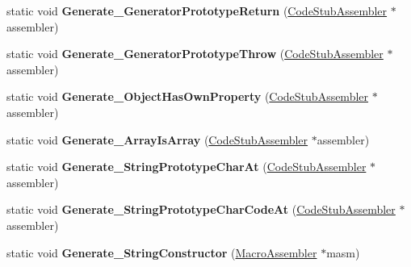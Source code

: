 \begin{DoxyCompactItemize}
\item 
static void {\bfseries Generate\+\_\+\+Generator\+Prototype\+Return} (\hyperlink{classv8_1_1internal_1_1_code_stub_assembler}{Code\+Stub\+Assembler} $\ast$assembler)\hypertarget{classv8_1_1internal_1_1_builtins_a6ef3810594f5eb2e21593a832d513325}{}\label{classv8_1_1internal_1_1_builtins_a6ef3810594f5eb2e21593a832d513325}

\item 
static void {\bfseries Generate\+\_\+\+Generator\+Prototype\+Throw} (\hyperlink{classv8_1_1internal_1_1_code_stub_assembler}{Code\+Stub\+Assembler} $\ast$assembler)\hypertarget{classv8_1_1internal_1_1_builtins_ac3220fe2c4417db9bfa2c847f2399386}{}\label{classv8_1_1internal_1_1_builtins_ac3220fe2c4417db9bfa2c847f2399386}

\item 
static void {\bfseries Generate\+\_\+\+Object\+Has\+Own\+Property} (\hyperlink{classv8_1_1internal_1_1_code_stub_assembler}{Code\+Stub\+Assembler} $\ast$assembler)\hypertarget{classv8_1_1internal_1_1_builtins_a40805d22b777f387e73c6fb1110695af}{}\label{classv8_1_1internal_1_1_builtins_a40805d22b777f387e73c6fb1110695af}

\item 
static void {\bfseries Generate\+\_\+\+Array\+Is\+Array} (\hyperlink{classv8_1_1internal_1_1_code_stub_assembler}{Code\+Stub\+Assembler} $\ast$assembler)\hypertarget{classv8_1_1internal_1_1_builtins_a556a327920caab642e0b76997a2bfa83}{}\label{classv8_1_1internal_1_1_builtins_a556a327920caab642e0b76997a2bfa83}

\item 
static void {\bfseries Generate\+\_\+\+String\+Prototype\+Char\+At} (\hyperlink{classv8_1_1internal_1_1_code_stub_assembler}{Code\+Stub\+Assembler} $\ast$assembler)\hypertarget{classv8_1_1internal_1_1_builtins_ab687d73326aad247ccd5a515225fb392}{}\label{classv8_1_1internal_1_1_builtins_ab687d73326aad247ccd5a515225fb392}

\item 
static void {\bfseries Generate\+\_\+\+String\+Prototype\+Char\+Code\+At} (\hyperlink{classv8_1_1internal_1_1_code_stub_assembler}{Code\+Stub\+Assembler} $\ast$assembler)\hypertarget{classv8_1_1internal_1_1_builtins_a0255f2b66f9b5f3e7cc1b46b7b7e7a99}{}\label{classv8_1_1internal_1_1_builtins_a0255f2b66f9b5f3e7cc1b46b7b7e7a99}

\item 
static void {\bfseries Generate\+\_\+\+String\+Constructor} (\hyperlink{classv8_1_1internal_1_1_macro_assembler}{Macro\+Assembler} $\ast$masm)\hypertarget{classv8_1_1internal_1_1_builtins_ad86a86d07f045644a5bb2b421505f47f}{}\label{classv8_1_1internal_1_1_builtins_ad86a86d07f045644a5bb2b421505f47f}


\end{DoxyCompactItemize}
